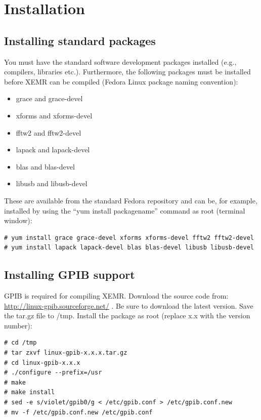 \documentclass[byrevtex,amssymb,aps,pra,floatfix,letterpaper]{revtex4}
\begin{document}
\section{Installation}

\subsection{Installing standard packages}

You must have the standard software development packages installed (e.g., compilers, libraries etc.). Furthermore, the following packages must be installed before XEMR can be compiled (Fedora Linux package naming convention):

\begin{itemize}
\item grace and grace-devel
\item xforms and xforms-devel
\item fftw2 and fftw2-devel
\item lapack and lapack-devel
\item blas and blas-devel
\item libusb and libusb-devel
\end{itemize}

\noindent
These are available from the standard Fedora repository and can be, for example, installed by using the ``yum install packagename'' command as root (terminal window):

\begin{verbatim}
# yum install grace grace-devel xforms xforms-devel fftw2 fftw2-devel
# yum install lapack lapack-devel blas blas-devel libusb libusb-devel
\end{verbatim}

\subsection{Installing GPIB support}

GPIB is required for compiling XEMR. Download the source code from: \url{http://linux-gpib.sourceforge.net/} . Be sure to download the latest version. Save the tar.gz file to /tmp. Install the package as root (replace x.x with the version number):

\begin{verbatim}
# cd /tmp
# tar zxvf linux-gpib-x.x.x.tar.gz
# cd linux-gpib-x.x.x
# ./configure --prefix=/usr
# make
# make install
# sed -e s/violet/gpib0/g < /etc/gpib.conf > /etc/gpib.conf.new
# mv -f /etc/gpib.conf.new /etc/gpib.conf
\end{verbatim}
\end{document}
